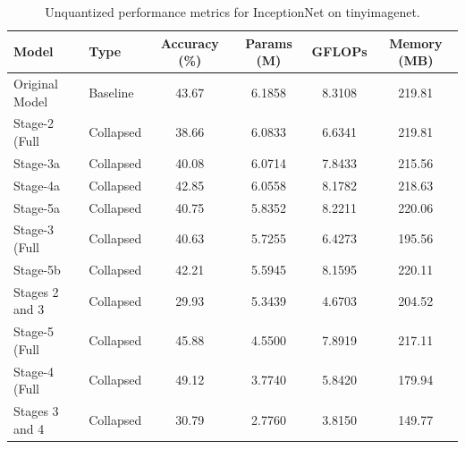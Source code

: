 \begin{table}
\caption{Unquantized performance metrics for InceptionNet on tinyimagenet.}
\label{tab:InceptionNet_tinyimagenet_unquant}
\begin{tabular}{llcccc}
\toprule
Model & Type & Accuracy (\%) & Params (M) & GFLOPs & Memory (MB) \\
\midrule
Original Model & Baseline & 43.67 & 6.1858 & 8.3108 & 219.81 \\
Stage-2 (Full & Collapsed & 38.66 & 6.0833 & 6.6341 & 219.81 \\
Stage-3a & Collapsed & 40.08 & 6.0714 & 7.8433 & 215.56 \\
Stage-4a & Collapsed & 42.85 & 6.0558 & 8.1782 & 218.63 \\
Stage-5a & Collapsed & 40.75 & 5.8352 & 8.2211 & 220.06 \\
Stage-3 (Full & Collapsed & 40.63 & 5.7255 & 6.4273 & 195.56 \\
Stage-5b & Collapsed & 42.21 & 5.5945 & 8.1595 & 220.11 \\
Stages 2 and 3 & Collapsed & 29.93 & 5.3439 & 4.6703 & 204.52 \\
Stage-5 (Full & Collapsed & 45.88 & 4.5500 & 7.8919 & 217.11 \\
Stage-4 (Full & Collapsed & 49.12 & 3.7740 & 5.8420 & 179.94 \\
Stages 3 and 4 & Collapsed & 30.79 & 2.7760 & 3.8150 & 149.77 \\
\bottomrule
\end{tabular}
\end{table}
